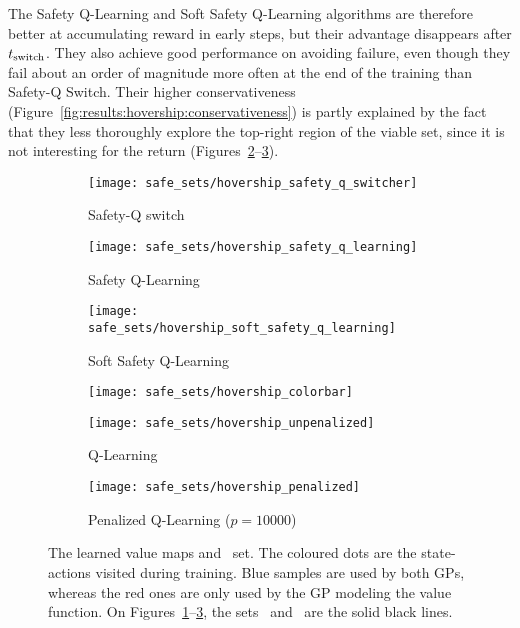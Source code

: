 The Safety Q-Learning and Soft Safety Q-Learning algorithms are therefore better at accumulating reward in early steps, but their advantage disappears after $t_\text{switch}$. They also achieve good performance on avoiding failure, even though they fail about an order of magnitude more often at the end of the training than Safety-Q Switch. Their higher conservativeness (Figure~\ref{fig:results:hovership:conservativeness}) is partly explained by the fact that they less thoroughly explore the top-right region of the viable set, since it is not interesting for the return (Figures~\ref{fig:learned sets:hovership:safety q learning}--\ref{fig:learned sets:hovership:soft safety q learning}).\par

\begin{figure}
	\centering
	\begin{subfigure}{0.29\textwidth}
		\centering
		\texttt{[image: safe\_sets/hovership\_safety\_q\_switcher]}
		\caption{Safety-Q switch}
		\label{fig:learned sets:hovership:switch}
	\end{subfigure}	
	\begin{subfigure}{0.29\textwidth}
		\centering
		\texttt{[image: safe\_sets/hovership\_safety\_q\_learning]}
		\caption{Safety Q-Learning}
		\label{fig:learned sets:hovership:safety q learning}
	\end{subfigure}	
	\begin{subfigure}{0.29\textwidth}
		\centering
		\texttt{[image: safe\_sets/hovership\_soft\_safety\_q\_learning]}
		\caption{Soft Safety Q-Learning}
		\label{fig:learned sets:hovership:soft safety q learning}
	\end{subfigure}		
	\begin{subfigure}{0.1\textwidth}
		\texttt{[image: safe\_sets/hovership\_colorbar]}	
		\vspace{0.8cm}
	\end{subfigure}\newline
	\begin{subfigure}{0.39\textwidth}
		\texttt{[image: safe\_sets/hovership\_unpenalized]}
		\caption{Q-Learning}
		\label{fig:learned sets:hovership:q learning}
	\end{subfigure}
	\begin{subfigure}{0.39\textwidth}
		\captionsetup{width=1.1\textwidth}
		\texttt{[image: safe\_sets/hovership\_penalized]}
		\caption{Penalized Q-Learning ($p=10000$)}
		\label{fig:learned sets:hovership:penalized}
	\end{subfigure}
	\caption{The learned value maps and \Qcaut~set. The coloured dots are the state-actions visited during training. Blue samples are used by both GPs, whereas the red ones are only used by the GP modeling the value function. On Figures~\ref{fig:learned sets:hovership:switch}--\ref{fig:learned sets:hovership:soft safety q learning}, the sets \QV~and \Qcaut~are the solid black lines.}
	\label{fig:learned sets:hovership}
\end{figure}
